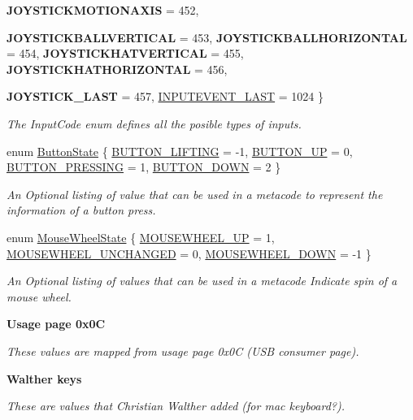 \begin{DoxyCompactItemize}
{\bfseries JOYSTICKMOTIONAXIS} =  452, 
\par
{\bfseries JOYSTICKBALLVERTICAL} =  453, 
{\bfseries JOYSTICKBALLHORIZONTAL} =  454, 
{\bfseries JOYSTICKHATVERTICAL} =  455, 
{\bfseries JOYSTICKHATHORIZONTAL} =  456, 
\par
{\bfseries JOYSTICK\_\-LAST} =  457, 
\hyperlink{classphys_1_1MetaCode_a3e501cbb5bf0f6f1fdb7211465bda8d8adc78bfd04a85c4bbe39718f9acacbbe3}{INPUTEVENT\_\-LAST} =  1024
 \}
\begin{DoxyCompactList}\small\item\em The InputCode enum defines all the posible types of inputs. \item\end{DoxyCompactList}\item 
enum \hyperlink{classphys_1_1MetaCode_a2fdfb26b3e50ceb0ccc60bfc4c3d6ac2}{ButtonState} \{ \hyperlink{classphys_1_1MetaCode_a2fdfb26b3e50ceb0ccc60bfc4c3d6ac2a6b5564408703517f36debd8c423e2dee}{BUTTON\_\-LIFTING} =  -\/1, 
\hyperlink{classphys_1_1MetaCode_a2fdfb26b3e50ceb0ccc60bfc4c3d6ac2ae275c52779b0f6ec37533af256a70cc3}{BUTTON\_\-UP} =  0, 
\hyperlink{classphys_1_1MetaCode_a2fdfb26b3e50ceb0ccc60bfc4c3d6ac2a33669b2b9ca814664296da55702e412d}{BUTTON\_\-PRESSING} =  1, 
\hyperlink{classphys_1_1MetaCode_a2fdfb26b3e50ceb0ccc60bfc4c3d6ac2a5b52ee1db94dbc2db23f3b4c267b5438}{BUTTON\_\-DOWN} =  2
 \}
\begin{DoxyCompactList}\small\item\em An Optional listing of value that can be used in a metacode to represent the information of a button press. \item\end{DoxyCompactList}\item 
enum \hyperlink{classphys_1_1MetaCode_af9ba277d1ef071be8861e35c2b7d82d6}{MouseWheelState} \{ \hyperlink{classphys_1_1MetaCode_af9ba277d1ef071be8861e35c2b7d82d6a15542262fc8fe9a3d6746f2b84ecde11}{MOUSEWHEEL\_\-UP} =  1, 
\hyperlink{classphys_1_1MetaCode_af9ba277d1ef071be8861e35c2b7d82d6aa3d86fe74d1c191d7c57f886c0b8d99a}{MOUSEWHEEL\_\-UNCHANGED} =  0, 
\hyperlink{classphys_1_1MetaCode_af9ba277d1ef071be8861e35c2b7d82d6ab6edd0886d2ec2d2917bbad96ce3d510}{MOUSEWHEEL\_\-DOWN} =  -\/1
 \}
\begin{DoxyCompactList}\small\item\em An Optional listing of values that can be used in a metacode Indicate spin of a mouse wheel. \item\end{DoxyCompactList}\end{DoxyCompactItemize}
\begin{Indent}{\bf Usage page 0x0C}\par
{\em \label{_amgrpd4ef4ec32b3df3fcedf5c699f77b38f1}
 These values are mapped from usage page 0x0C (USB consumer page). }\end{Indent}
\begin{Indent}{\bf Walther keys}\par
{\em \label{_amgrpba1ec37238b609de347cf253fe3e047e}
 These are values that Christian Walther added (for mac keyboard?). }\end{Indent}
